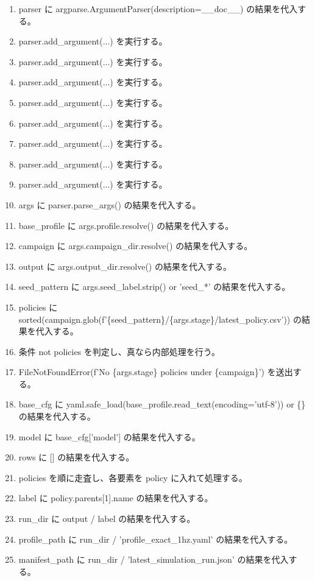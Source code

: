 \documentclass[a4paper,11pt]{article}
\begin{document}
            \begin{enumerate}[leftmargin=1.8em]
            \item parser に argparse.ArgumentParser(description=\_\_doc\_\_) の結果を代入する。
\item parser.add\_argument(...) を実行する。
\item parser.add\_argument(...) を実行する。
\item parser.add\_argument(...) を実行する。
\item parser.add\_argument(...) を実行する。
\item parser.add\_argument(...) を実行する。
\item parser.add\_argument(...) を実行する。
\item parser.add\_argument(...) を実行する。
\item parser.add\_argument(...) を実行する。
\item args に parser.parse\_args() の結果を代入する。
\item base\_profile に args.profile.resolve() の結果を代入する。
\item campaign に args.campaign\_dir.resolve() の結果を代入する。
\item output に args.output\_dir.resolve() の結果を代入する。
\item seed\_pattern に args.seed\_label.strip() or 'seed\_*' の結果を代入する。
\item policies に sorted(campaign.glob(f'\{seed\_pattern\}/\{args.stage\}/latest\_policy.csv')) の結果を代入する。
\item 条件 not policies を判定し、真なら内部処理を行う。
\item   FileNotFoundError(f'No \{args.stage\} policies under \{campaign\}') を送出する。
\item base\_cfg に yaml.safe\_load(base\_profile.read\_text(encoding='utf-8')) or \{\} の結果を代入する。
\item model に base\_cfg['model'] の結果を代入する。
\item rows に [] の結果を代入する。
\item policies を順に走査し、各要素を policy に入れて処理する。
\item   label に policy.parents[1].name の結果を代入する。
\item   run\_dir に output / label の結果を代入する。
\item   profile\_path に run\_dir / 'profile\_exact\_1hz.yaml' の結果を代入する。
\item   manifest\_path に run\_dir / 'latest\_simulation\_run.json' の結果を代入する。

\end{enumerate}
\end{document}
